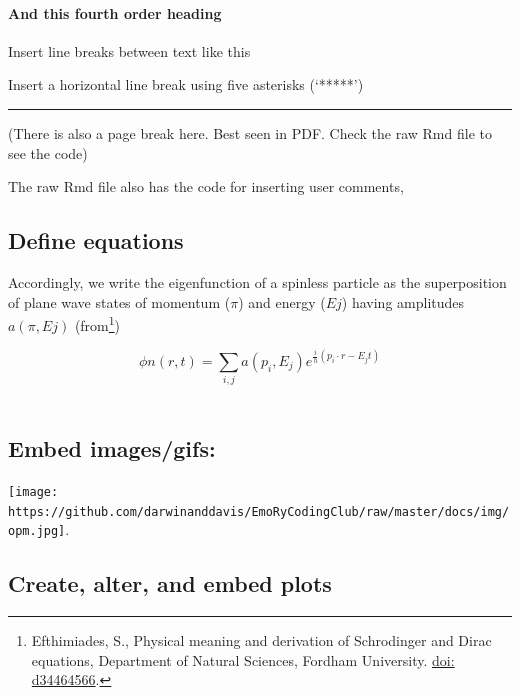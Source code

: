 \documentclass[portrait]{article}
\let\oldparagraph\paragraph
\renewcommand{\paragraph}[1]{\oldparagraph{#1}\mbox{}}
\begin{document}
\paragraph{And this fourth order
heading}\label{and-this-fourth-order-heading}

Insert line breaks between text like this

Insert a horizontal line break using five asterisks (`*****')

\begin{center}\rule{0.5\linewidth}{\linethickness}\end{center}

(There is also a page break here. Best seen in PDF. Check the raw Rmd
file to see the code)

The raw Rmd file also has the code for inserting user comments,

\newpage    

\subsection{Define equations}\label{define-equations}

Accordingly, we write the eigenfunction of a spinless particle as the
superposition of plane wave states of momentum (\(\pi\)) and energy
(\(Ej\)) having amplitudes \(a(\pi,Ej)\) (from\footnote{Efthimiades, S.,
  Physical meaning and derivation of Schrodinger and Dirac equations,
  Department of Natural Sciences, Fordham University.
  \href{https://arxiv.org/vc/quant-ph/papers/0607/0607001v1.pdf}{doi:
  d34464566}.})

\[  
\phi n(r,t) =  
  \sum_{i, j} a(p_{i},E_{j})
  e^{
  \frac{i}
  {h}
  (p_{i} \cdot r - E_{j}t) 
}
\] ~

\subsection{Embed images/gifs:}\label{embed-imagesgifs}

\texttt{[image: https://github.com/darwinanddavis/EmoRyCodingClub/raw/master/docs/img/opm.jpg]}.

\newpage  

\subsection{Create, alter, and embed
plots}\label{create-alter-and-embed-plots}
\end{document}
